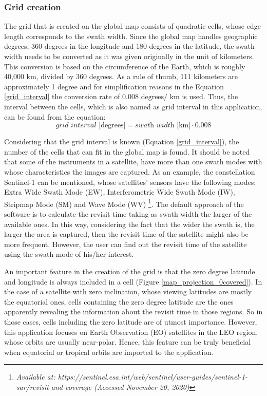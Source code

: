 \bigskip
\subsubsection{Grid creation}
\bigskip

The grid that is created on the global map consists of quadratic cells, whose edge length corresponds to the swath width. Since the global map handles geographic degrees, 360 degrees in the longitude and 180 degrees in the latitude, the swath width needs to be converted as it was given originally in the unit of kilometers. This conversion is based on the circumference of the Earth, which is roughly 40,000 km, divided by 360 degrees. As a rule of thumb, 111 kilometers are approximately 1 degree and for simplification reasons in the Equation \ref{grid_interval} the conversion rate of $0.008 \text{ degrees/ km}$ is used. Thus, the interval between the cells, which is also named as grid interval in this application, can be found from the equation:
\begin{equation}
\label{grid_interval}
\textit{grid interval} \text{ [degrees]} = \textit{swath width} \text{ [km]} \cdot 0.008
\end{equation}

Considering that the grid interval is known (Equation \ref{grid_interval}), the number of the cells that can fit in the global map is found. It should be noted that some of the instruments in a satellite, have more than one swath modes with whose characteristics the images are captured. As an example, the constellation Sentinel-1 can be mentioned, whose satellites' sensors have the following modes: Extra Wide Swath Mode (EW), Interferometric Wide Swath Mode (IW), Stripmap Mode (SM) and Wave Mode (WV) \footnote{\label{Sentinel1_source}\textit{Available at: https://sentinel.esa.int/web/sentinel/user-guides/sentinel-1-sar/revisit-and-coverage (Accessed November 20, 2020)}}. The default approach of the software is to calculate the revisit time taking as swath width the larger of the available ones. In this way, considering the fact that the wider the swath is, the larger the area is captured, then the revisit time of the satellite might also be more frequent. However, the user can find out the revisit time of the satellite using the swath mode of his/her interest.

An important feature in the creation of the grid is that the zero degree latitude and longitude is always included in a cell (Figure \ref{map_projection_0covered}). In the case of a satellite with zero inclination, whose viewing latitudes are mostly the equatorial ones, cells containing the zero degree latitude are the ones apparently revealing the information about the revisit time in those regions. So in those cases, cells including the zero latitude are of utmost importance. However, this application focuses on Earth Observation (EO) satellites in the LEO region, whose orbits are usually near-polar. Hence, this feature can be truly beneficial when equatorial or tropical orbits are imported to the application.


